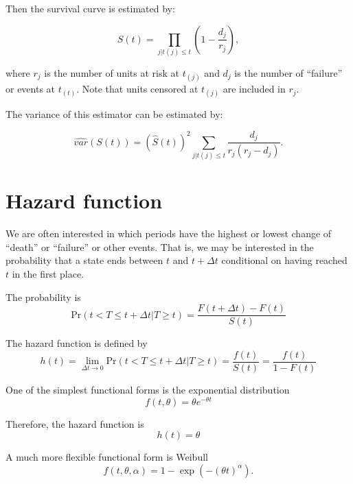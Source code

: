 Then the survival curve is estimated by:

\begin{equation}
\hat S(t) = \prod_{j | t{(j)} \le t} (1-\frac{d_j}{r_j}),
\end{equation}

where $r_j$ is the number of units at risk at $t_{(j)}$ and $d_j$ is
the number of ``failure'' or events at $t_{(t)}$.  Note that units
censored at $t_{(j)}$ are included in $r_j$.

The variance of this estimator can be estimated by:

\begin{equation}
\hat {var} (S(t)) = (\hat S(t))^2 \sum_{j | t{(j)} \le t} \frac{d_j}{r_j(r_j-d_j)}.
\end{equation}



\section{Hazard function}

We are often interested in which periods have the highest or lowest
change of ``death'' or ``failure'' or other events.  That is, we may
be interested in the probability that a state ends between $t$ and $t+
\Delta t$ conditional on having reached $t$ in the first place. 

The probability is
\begin{equation}
\mbox{Pr} (t<T \leq t+\Delta t | T \geq t)=\frac{F(t+\Delta
t)-F(t)}{S(t)}
\end{equation}

The hazard function is defined by
\begin{equation}
h(t)=\lim_{\Delta t \rightarrow 0}\mbox{Pr} (t<T \leq t+\Delta t |
T \geq t)=\frac{f(t)}{S(t)}=\frac{f(t)}{1-F(t)}
\end{equation}

One of the simplest functional forms is the exponential
distribution
\begin{equation}
f(t,\theta)=\theta e^{-\theta t}
\end{equation}

Therefore, the hazard function is
\begin{equation}
h(t)=\theta
\end{equation}

A much more flexible functional form is Weibull
\begin{equation}
f(t,\theta, \alpha)=1-\exp(-(\theta t)^{\alpha}).
\end{equation}

